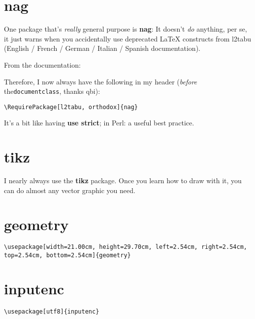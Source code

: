 \section{nag}
One package that’s \textit{really} general purpose is \textbf{nag}: It doesn’t \textit{do} anything, per se, it just warns when you accidentally use deprecated \LaTeX{} constructs from l2tabu (English / French / German / Italian / Spanish documentation).

From the documentation:


Therefore, I now always have the following in my header (\textit{before} the\lstinline[language={[LaTeX]TeX}]|documentclass|, thanks qbi):

\begin{lstlisting}[language={[LaTeX]TeX}]
\RequirePackage[l2tabu, orthodox]{nag}
\end{lstlisting}

It’s a bit like having \textbf{use strict}; in Perl: a useful best practice.

\section{tikz}
I nearly always use the \textbf{tikz} package. Once you learn how to draw with it, you can do almost any vector graphic you need.

\section{geometry}
\begin{lstlisting}[language={[LaTeX]TeX}]
\usepackage[width=21.00cm, height=29.70cm, left=2.54cm, right=2.54cm, top=2.54cm, bottom=2.54cm]{geometry}
\end{lstlisting}

\section{inputenc}
\begin{lstlisting}[language={[LaTeX]TeX}]
\usepackage[utf8]{inputenc}
\end{lstlisting}

